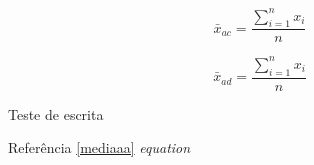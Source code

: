 \documentclass[a4paper, 11pt]{book}  %
\begin{document}
\begin{equation}
    \bar{x}_{ac} = \frac{\displaystyle \sum_{i=1}^{n}{x_{i}}}{n}
\end{equation}


\begin{equation}
    \bar{x}_{ad} = \frac{\displaystyle \sum_{i=1}^{n}{x_{i}}}{n} \nonumber
\end{equation}

Teste de escrita



Referência \ref{mediaaa}
\textit{equation}
\end{document}
